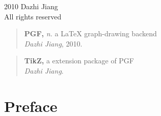 \documentclass[10pt,a4paper,extrafontsizes]{memoir}
\newcommand{\PWnote}[2]{}
\newif\ifMASTER
\newcommand\svnidlong[4]{}
\begin{document}
\PWnote{2009/06/26}{Updated the copyright page for 9th impression}
\begingroup
\footnotesize
\setlength{\parindent}{0pt}
\setlength{\parskip}{\baselineskip}
\textcopyright{} 2010 Dazhi Jiang \\
All rights reserved


\ifMASTER
Manual last changed \svnyear/\svnmonth/\svnday
\fi

\endgroup

\clearpage
\vspace*{\fill}
\begin{quote}
\textbf{PGF,} \textit{n.} a LaTeX graph-drawing backend \\[0.5\baselineskip]
  \hspace*{\fill} 
      \textit{Dazhi Jiang}, 2010.
\end{quote}

\vspace{2\baselineskip}

\begin{quote}
\textbf{TikZ,} a extension package of PGF \\[0.5\baselineskip]
  \hspace*{\fill} \textit{Dazhi Jiang}.
\end{quote}

\vspace{2\baselineskip}

\vspace*{\fill}

\cleardoublepage

\pagestyle{headings}

\setupshorttoc
\tableofcontents
\clearpage
\setupparasubsecs
\setupmaintoc
\tableofcontents
\setlength{\unitlength}{1pt}
\clearpage
\listoffigures
\clearpage
\listoftables
\clearpage
\listofegresults




\svnidlong
{$Ignore: $}
{$LastChangedDate: 2010-05-13 17:10:00 +0200 (Thu, 13 May 2010) $}
{$LastChangedRevision: 210 $}
{$LastChangedBy: daleif $}

\chapter{Preface}
\end{document}
